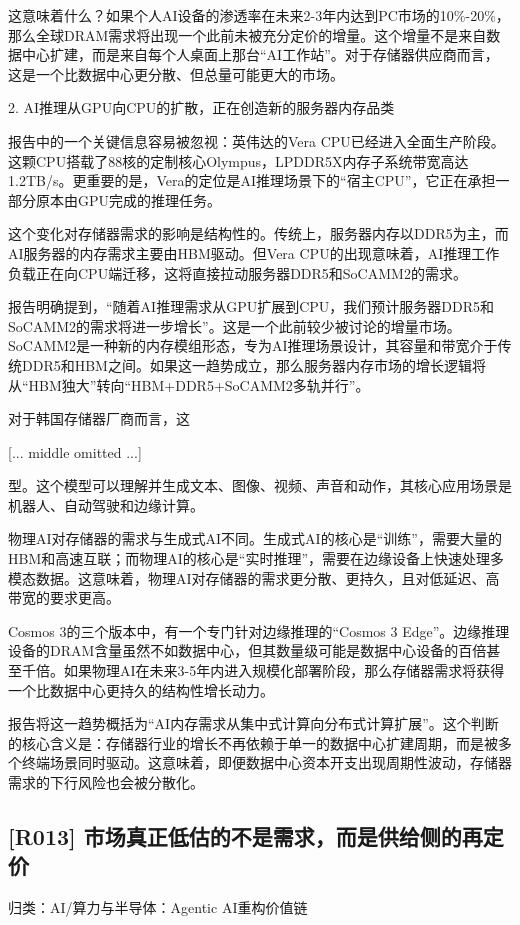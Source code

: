 \documentclass[11pt]{ctexart}
\begin{document}
这意味着什么？如果个人AI设备的渗透率在未来2-3年内达到PC市场的10\%-20\%，那么全球DRAM需求将出现一个此前未被充分定价的增量。这个增量不是来自数据中心扩建，而是来自每个人桌面上那台“AI工作站”。对于存储器供应商而言，这是一个比数据中心更分散、但总量可能更大的市场。

2. AI推理从GPU向CPU的扩散，正在创造新的服务器内存品类

报告中的一个关键信息容易被忽视：英伟达的Vera CPU已经进入全面生产阶段。这颗CPU搭载了88核的定制核心Olympus，LPDDR5X内存子系统带宽高达1.2TB/s。更重要的是，Vera的定位是AI推理场景下的“宿主CPU”，它正在承担一部分原本由GPU完成的推理任务。

这个变化对存储器需求的影响是结构性的。传统上，服务器内存以DDR5为主，而AI服务器的内存需求主要由HBM驱动。但Vera CPU的出现意味着，AI推理工作负载正在向CPU端迁移，这将直接拉动服务器DDR5和SoCAMM2的需求。

报告明确提到，“随着AI推理需求从GPU扩展到CPU，我们预计服务器DDR5和SoCAMM2的需求将进一步增长”。这是一个此前较少被讨论的增量市场。SoCAMM2是一种新的内存模组形态，专为AI推理场景设计，其容量和带宽介于传统DDR5和HBM之间。如果这一趋势成立，那么服务器内存市场的增长逻辑将从“HBM独大”转向“HBM+DDR5+SoCAMM2多轨并行”。

对于韩国存储器厂商而言，这

[... middle omitted ...]

型。这个模型可以理解并生成文本、图像、视频、声音和动作，其核心应用场景是机器人、自动驾驶和边缘计算。

物理AI对存储器的需求与生成式AI不同。生成式AI的核心是“训练”，需要大量的HBM和高速互联；而物理AI的核心是“实时推理”，需要在边缘设备上快速处理多模态数据。这意味着，物理AI对存储器的需求更分散、更持久，且对低延迟、高带宽的要求更高。

Cosmos 3的三个版本中，有一个专门针对边缘推理的“Cosmos 3 Edge”。边缘推理设备的DRAM含量虽然不如数据中心，但其数量级可能是数据中心设备的百倍甚至千倍。如果物理AI在未来3-5年内进入规模化部署阶段，那么存储器需求将获得一个比数据中心更持久的结构性增长动力。

报告将这一趋势概括为“AI内存需求从集中式计算向分布式计算扩展”。这个判断的核心含义是：存储器行业的增长不再依赖于单一的数据中心扩建周期，而是被多个终端场景同时驱动。这意味着，即便数据中心资本开支出现周期性波动，存储器需求的下行风险也会被分散化。

\subsection{[R013] 市场真正低估的不是需求，而是供给侧的再定价}
{\small\color{refgray}归类：AI/算力与半导体：Agentic AI重构价值链}
\end{document}
